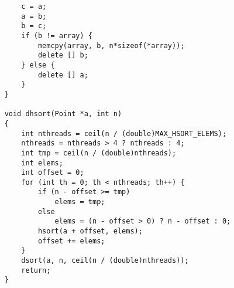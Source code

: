 \documentclass[oneside,final,14pt]{extreport}
\begin{document}
\begin{verbatim}
        c = a;
        a = b;
        b = c;
        if (b != array) {
            memcpy(array, b, n*sizeof(*array));
            delete [] b;
        } else {
            delete [] a;
        }
    }

    void dhsort(Point *a, int n)
    {
        int nthreads = ceil(n / (double)MAX_HSORT_ELEMS);
        nthreads = nthreads > 4 ? nthreads : 4;
        int tmp = ceil(n / (double)nthreads);
        int elems;
        int offset = 0;
        for (int th = 0; th < nthreads; th++) {
            if (n - offset >= tmp)
                elems = tmp;
            else
                elems = (n - offset > 0) ? n - offset : 0;
            hsort(a + offset, elems);
            offset += elems;
        }
        dsort(a, n, ceil(n / (double)nthreads));
        return;
    }
\end{verbatim}
\end{document}
